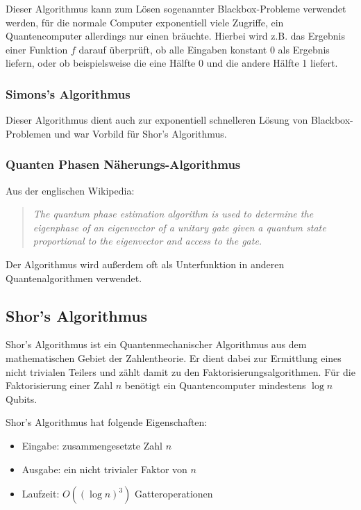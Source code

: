 Dieser Algorithmus kann zum Lösen sogenannter Blackbox-Probleme verwendet werden, für die normale Computer exponentiell viele Zugriffe, ein Quantencomputer allerdings nur einen bräuchte.
Hierbei wird z.B. das Ergebnis einer Funktion $f$ darauf überprüft, ob alle Eingaben konstant 0 als Ergebnis liefern, oder ob beispielsweise die eine Hälfte 0 und die andere Hälfte 1 liefert. \cite{quantenalgorithmgwiki}


\subsubsection{Simons's Algorithmus}

Dieser Algorithmus dient auch zur exponentiell schnelleren Lösung von Blackbox-Problemen und war Vorbild für Shor's Algorithmus. \cite{quantenalgorithmgwiki}

\subsubsection{Quanten Phasen Näherungs-Algorithmus}

Aus der englischen Wikipedia: \cite{quantenalgorithmgwiki}
\begin{quote}
    \textit{The quantum phase estimation algorithm is used to determine the eigenphase of an eigenvector of a unitary gate given a quantum state proportional to the eigenvector and access to the gate.}
\end{quote}
Der Algorithmus wird außerdem oft als Unterfunktion in anderen Quantenalgorithmen verwendet. 


\subsection{Shor's Algorithmus}
\label{sec:Shor's Algorithmus}

Shor's Algorithmus ist ein Quantenmechanischer Algorithmus aus dem mathematischen Gebiet der Zahlentheorie.
Er dient dabei zur Ermittlung eines nicht trivialen Teilers und zählt damit zu den Faktorisierungsalgorithmen.
Für die Faktorisierung einer Zahl $n$ benötigt ein Quantencomputer mindestens $\log{n}$ Qubits.

\newpage

Shor's Algorithmus hat folgende Eigenschaften: \cite{shorwiki}

\begin{itemize}
    \item Eingabe:  zusammengesetzte Zahl $n$
    \item Ausgabe:  ein nicht trivialer Faktor von $n$
    \item Laufzeit: $O((\log{n})^3)$ Gatteroperationen 
\end{itemize}

